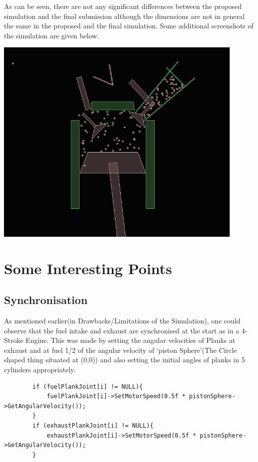\documentclass[11pt]{article}
\begin{document}
\indent As can be seen, there are not any significant differences between the proposed simulation and the final submission although the dimensions are not in general the same in the proposed and the final simulation.
\indent Some additional screenshots of the simulation are given below.

\begin{center}
	\includegraphics[width=12cm]{./images/exhaustOpenReport.png}
\end{center}

\section{Some Interesting Points}

\subsection{Synchronisation}
As mentioned earlier(in Drawbacks/Limitations of the Simulation), one could observe that the fuel intake and exhaust are synchronised at the start as in a 4-Stroke Engine. This was made by setting the angular velocities of Planks at exhaust and at fuel 1/2 of the angular velocity of `piston Sphere'(The Circle shaped thing situated at (0,0)) and also setting the initial angles of planks in 5 cylinders appropriately.
\begin{center}
\begin{verbatim}
		if (fuelPlankJoint[i] != NULL){
			fuelPlankJoint[i]->SetMotorSpeed(0.5f * pistonSphere->GetAngularVelocity());
		}
		if (exhaustPlankJoint[i] != NULL){
			exhaustPlankJoint[i]->SetMotorSpeed(0.5f * pistonSphere->GetAngularVelocity());
		}


\end{verbatim}
\end{center}
\end{document}
